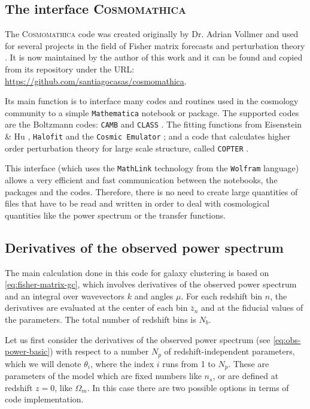 \subsection{The interface \textsc{Cosmomathica} \label{sub:cosmomathica}}

The \textsc{Cosmomathica} code was created originally by Dr. Adrian Vollmer and used 
for several projects in the field of Fisher matrix forecasts and perturbation theory \cite{papers by Adrian}.
It is now maintained by the author of this work and it can be found 
and copied from its repository under the URL: \url{https://github.com/santiagocasas/cosmomathica}.

Its main function is to interface many codes and routines used in the cosmology community to a simple \texttt{Mathematica} notebook
or package.
The supported codes are the Boltzmann codes: \texttt{CAMB} \cite{lewis_efficient_2000} and \texttt{CLASS} \cite{lesgourges}.
The fitting functions from Eisenstein \& Hu \cite{cite Eisenstein}, \texttt{Halofit} \cite{smith} and the \texttt{Cosmic Emulator}
\cite{heitmann_coyote_2010, heitmann_coyote_2014}; and a code that calculates higher order perturbation theory for large scale structure, 
called \texttt{COPTER} \cite{find citation}.

This interface (which uses the \texttt{MathLink} technology from the \texttt{Wolfram} language) allows a very efficient and fast communication
between the notebooks, the packages and the codes. Therefore, there is no need to create large quantities of files that have to be read
and written in order to deal with cosmological quantities like the power spectrum or the transfer functions.


\subsection{Derivatives of the observed power spectrum}

The main calculation done in this code for galaxy clustering is based on \cref{eq:fisher-matrix-gc}, 
which involves derivatives of the observed power spectrum and an integral over wavevectors $k$ and angles $\mu$.
For each redshift bin $n$, the derivatives are evaluated at the center of each bin $\bar{z}_n$ and 
at the fiducial values of the parameters. The total number of redshift bins is $N_b$.

Let us first consider the derivatives of the observed power spectrum (see \cref{eq:obs-power-basic}) 
with respect to a number $N_p$ of redshift-independent parameters, which we will
denote $\theta_i$, where the index $i$ runs from 1 to $N_p$.
These are parameters of the model which are fixed numbers like $n_s$, or are defined at redshift $z=0$, like $\Omega_m$.
In this case there are two possible options in terms of code implementation.

